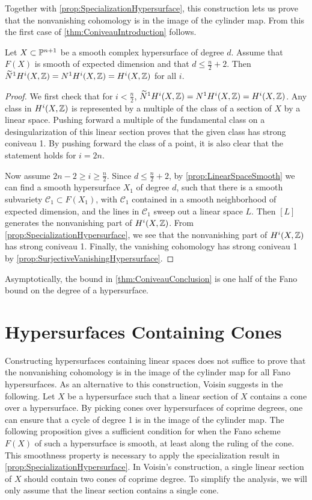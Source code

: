 Together with \cref{prop:SpecializationHypersurface}, this construction lets us prove that the nonvanishing cohomology is in the image of the cylinder map. From this the first case of \cref{thm:ConiveauIntroduction} follows.
\begin{theorem}
  \label{thm:ConiveauConclusion}
    Let $X \subset \P^{n+1}$ be a smooth complex hypersurface of degree $d$. Assume that $F(X)$ is smooth of expected dimension and that $d \leq \frac{n}{2}+2$. Then $\widetilde{N}^1H^i(X,\Z) = N^1H^i(X,\Z) = H^i(X,\Z)$ for all $i$.
\end{theorem}
\begin{proof}
We first check that for $i < \frac{n}{2}$, $\widetilde{N}^1H^i(X,\Z) = N^1H^i(X,\Z) = H^i(X,\Z)$. Any class in $H^i(X,\Z)$ is represented by a multiple of the class of a section of $X$ by a linear space. Pushing forward a multiple of the fundamental class on a desingularization of this linear section proves that the given class has strong coniveau 1. By pushing forward the class of a point, it is also clear that the statement holds for $i=2n$.

Now assume $2n-2 \geq i \geq \frac{n}{2}$. Since $d \leq \frac{n}{2}+2$, by \cref{prop:LinearSpaceSmooth} we can find a smooth hypersurface $X_1$ of degree $d$, such that there is a smooth subvariety $\mathcal{C}_1 \subset F(X_1)$, with $\mathcal{C}_1$ contained in a smooth neighborhood of expected dimension, and the lines in $\mathcal{C}_1$ sweep out a linear space $L$. Then $[L]$ generates the nonvanishing part of $H^i(X,\Z)$. From \cref{prop:SpecializationHypersurface}, we see that the nonvanishing part of $H^i(X,\Z)$ has strong coniveau 1. Finally, the vanishing cohomology has strong coniveau 1 by \cref{prop:SurjectiveVanishingHypersurface}.
\end{proof}
\begin{remark}
	Asymptotically, the bound in \cref{thm:ConiveauConclusion} is one half of the Fano bound on the degree of a hypersurface.
\end{remark}

\section{Hypersurfaces Containing Cones}
\label{sec:Cones}
Constructing hypersurfaces containing linear spaces does not suffice to prove that the nonvanishing cohomology is in the image of the cylinder map for all Fano hypersurfaces. As an alternative to this construction, Voisin suggests in \cite{VoisinConiveauThreefolds} the following. Let $X$ be a hypersurface such that a linear section of $X$ contains a cone over a hypersurface. By picking cones over hypersurfaces of coprime degrees, one can ensure that a cycle of degree 1 is in the image of the cylinder map. The following proposition gives a sufficient condition for when the Fano scheme $F(X)$ of such a hypersurface is smooth, at least along the ruling of the cone. This smoothness property is necessary to apply the specialization result in \cref{prop:SpecializationHypersurface}. In Voisin's construction, a single linear section of $X$ should contain two cones of coprime degree. To simplify the analysis, we will only assume that the linear section contains a single cone.

